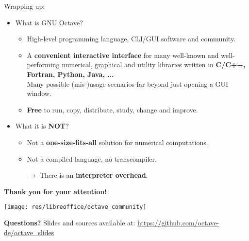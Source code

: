 \begin{frame}{Wrapping up:}
\begin{itemize}
\itemsep2em
\item
What is GNU Octave?
\begin{itemize}
\itemsep1em
\item
High-level programming language, CLI/GUI software and community.

\item
A \textbf{convenient interactive interface}
for many well-known and well-performing
numerical, graphical and utility libraries
written in \textbf{C/C++, Fortran, Python, Java, ...} \\[0.8em]

Many possible (mis-)usage scenarios far beyond just opening a GUI window.

\item
\textbf{Free} to run, copy, distribute, study, change and improve.
\end{itemize}

\item
What it is \textbf{NOT}?
\begin{itemize}
\itemsep1em
\item
Not a \textbf{one-size-fits-all} solution for numerical computations.

\item
Not a compiled language, no transcompiler.

$\rightarrow$ There is an \textbf{interpreter overhead}.
\end{itemize}
\end{itemize}
\end{frame}



\begin{frame}
\begin{center}
\textbf{\Large Thank you for your attention!}
\bigskip

\texttt{[image: res/libreoffice/octave\_community]}
\bigskip

\textbf{\Large Questions?}
\vfill\footnotesize
Slides and sources available at:
{\color{DarkBlue}\url{https://github.com/octave-de/octave_slides}}
\end{center}
\end{frame}
